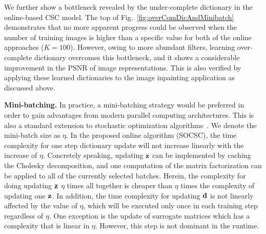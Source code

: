 We further show a bottleneck revealed by the under-complete dictionary
in the online-based CSC model. The top of
Fig.~\ref{fig:overComDicAndMinibatch} demonstrates that no more
apparent progress could be observed when the number of training images
is higher than a specific value for both of the online approaches
($K=100$). However, owing to more abundant filters, learning
over-complete dictionary overcomes this bottleneck, and it shows a
considerable improvement in the PSNR of image representations.  This
is also verified by applying these learned dictionaries to the image
inpainting application as discussed above.

{\bfseries Mini-batching.} In practice, a mini-batching strategy would
be preferred in order to gain advantages from modern parallel
computing architectures. This is also a standard extension to
stochastic optimization algorithms~\cite{Takac2013, PCDM, SCSG}. We
denote the mini-batch size as $\eta$. In the proposed online algorithm
(SOCSC), the time complexity for one step dictionary update will not
increase linearly with the increase of $\eta$. Concretely speaking,
updating $\code$ can be implemented by caching the Cholesky
decomposition, and one computation of the matrix factorization can be
applied to all of the currently selected batches. Herein, the
complexity for doing updating $\code$ $\eta$ times all together is
cheaper than $\eta$ times the complexity of updating one $\code$. In
addition, the time complexity for updating $\filter$ is not linearly
affected by the value of $\eta$, which will be executed only once in
each training step regardless of $\eta$. One exception is the update
of surrogate matrices which has a complexity that is linear in
$\eta$. However, this step is not dominant in the runtime.

